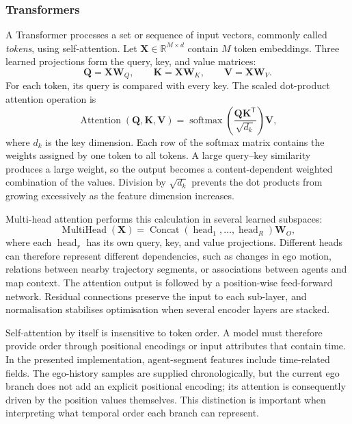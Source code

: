 \subsubsection{Transformers}

A Transformer processes a set or sequence of input vectors, commonly called \textit{tokens}, using self-attention. Let \(\mathbf{X}\in\mathbb{R}^{M\times d}\) contain \(M\) token embeddings. Three learned projections form the query, key, and value matrices:
\begin{equation}
    \mathbf{Q}=\mathbf{X}\mathbf{W}_Q,\qquad
    \mathbf{K}=\mathbf{X}\mathbf{W}_K,\qquad
    \mathbf{V}=\mathbf{X}\mathbf{W}_V.
    \label{eq:chapter_qkv_projection}
\end{equation}
For each token, its query is compared with every key. The scaled dot-product attention operation is
\begin{equation}
    \operatorname{Attention}(\mathbf{Q},\mathbf{K},\mathbf{V})
    =
    \operatorname{softmax}\!\left(
    \frac{\mathbf{Q}\mathbf{K}^{\mathsf{T}}}{\sqrt{d_k}}
    \right)\mathbf{V},
    \label{eq:chapter_scaled_attention}
\end{equation}
where \(d_k\) is the key dimension. Each row of the softmax matrix contains the weights assigned by one token to all tokens. A large query--key similarity produces a large weight, so the output becomes a content-dependent weighted combination of the values. Division by \(\sqrt{d_k}\) prevents the dot products from growing excessively as the feature dimension increases.

Multi-head attention performs this calculation in several learned subspaces:
\begin{equation}
    \operatorname{MultiHead}(\mathbf{X})
    =
    \operatorname{Concat}(\operatorname{head}_1,\ldots,
    \operatorname{head}_R)\mathbf{W}_O,
    \label{eq:chapter_multihead_attention}
\end{equation}
where each \(\operatorname{head}_r\) has its own query, key, and value projections. Different heads can therefore represent different dependencies, such as changes in ego motion, relations between nearby trajectory segments, or associations between agents and map context. The attention output is followed by a position-wise feed-forward network. Residual connections preserve the input to each sub-layer, and normalisation stabilises optimisation when several encoder layers are stacked.

Self-attention by itself is insensitive to token order. A model must therefore provide order through positional encodings or input attributes that contain time. In the presented implementation, agent-segment features include time-related fields. The ego-history samples are supplied chronologically, but the current ego branch does not add an explicit positional encoding; its attention is consequently driven by the position values themselves. This distinction is important when interpreting what temporal order each branch can represent.


